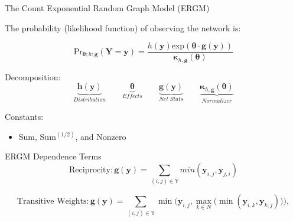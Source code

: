 \documentclass{beamer}
\newcommand{\bt}{\pmb{\theta}}
\begin{document}
\begin{frame}{The Count Exponential Random Graph Model (ERGM)}

The probability (likelihood function) of observing the network is:

$$ \text{Pr}_{\bm{\theta};h;\bm{g}}( \bm{Y}=\bm{y} )=\frac{ h(\bm{y})\text{exp}( \bm{\theta} \cdot \bm{g} (\bm{y}) )}{\bm{\kappa}_{h,\bm{g}}(\bm{\theta})} $$


Decomposition:
$$
\underbrace{\bm{h\left(y\right)}}_{Distribution} \qquad \underbrace{\bt}_{Effects} \qquad \underbrace{\bm{g\left(y\right)}}_{Net\hspace{3pt} Stats} \qquad \underbrace{\bm{\kappa}_{h,\bm{g}}(\bm{\theta})} _{Normalizer}
$$

Constants:
\begin{itemize}
\item{Sum, Sum$^{(1/2)}$, and Nonzero}
\end{itemize}


\end{frame}

\begin{frame}{ERGM Dependence Terms}
$$ \text{Reciprocity}: \bm{g\left(y\right)} = \sum_{(i,j) {\in} \mathbb{Y}}min(\bm{y}_{i,j},\bm{y}_{j,i})$$

$$\text{Transitive Weights}: \bm{g\left(y\right)} =  \sum_{(i,j) {\in} \mathbb{Y}}\min\bigg( \bm{y}_{i,j}, \max\limits_{k{\in}N}\Big(\min(\bm{y}_{i,k},\bm{y}_{k,j})\Big) \bigg),$$ 


\end{frame}
\end{document}
